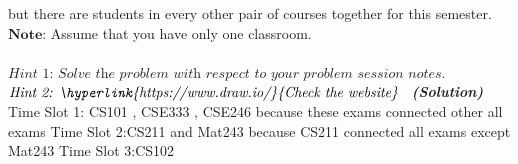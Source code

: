 \documentclass[a4 paper]{article}
\newcommand{\solution}{~\newline\textbf{\textit{(Solution)}} }
\newcommand{\0}{\mathbf{0}}
\begin{document}
but there are students in every other pair of courses together for this semester.\\ 
$\textbf{Note:}$ Assume that you have only one classroom.\\ \\
$\textit{Hint 1: Solve the problem with respect to your problem session notes.}$\\
$\textit{Hint 2: \hyperlink{https://www.draw.io/}{Check the website}}$
\newline
\solution
Time Slot 1: CS101 , CSE333 , CSE246 because these exams connected other all exams\newline
Time Slot 2:CS211 and Mat243 because CS211 connected all exams except Mat243\newline
Time Slot 3:CS102\newline
\end{document}
